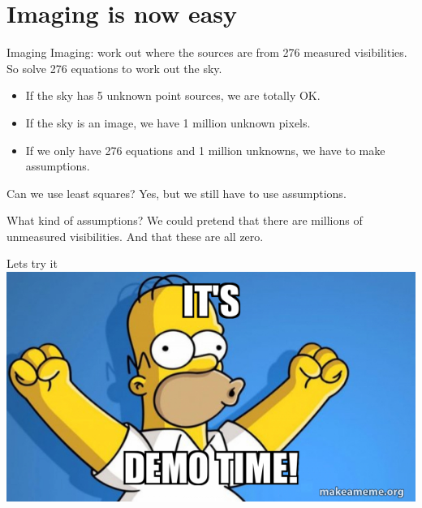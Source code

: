 \documentclass[ignorenonframetext]{beamer}
\begin{document}
\begin{frame}
\begin{columns}
\begin{column}{0.7\linewidth}
\begin{center}
  \end{center}
 \end{column}
\end{columns}
\end{frame}


\section{Imaging is now easy}

\begin{frame}{Imaging}
 Imaging: work out where the sources are from 276 measured visibilities. So solve 276 equations to work out the sky.
 \begin{itemize}
 \item If the sky has 5 unknown point sources, we are totally OK.
  \item If the sky is an image, we have 1 million unknown pixels.
  \item If we only have 276 equations and 1 million unknowns, we have to make assumptions.
 \end{itemize}
\begin{block}{Can we use least squares?}
 Yes, but we still have to use assumptions.
\end{block}
\begin{block}{What kind of assumptions?}
 We could pretend that there are millions of unmeasured visibilities. And that these are all zero.
\end{block}
\end{frame}

\begin{frame}{Lets try it}
\includegraphics[width=\linewidth]{images/demo-time.jpg}
\end{frame}
\end{document}
